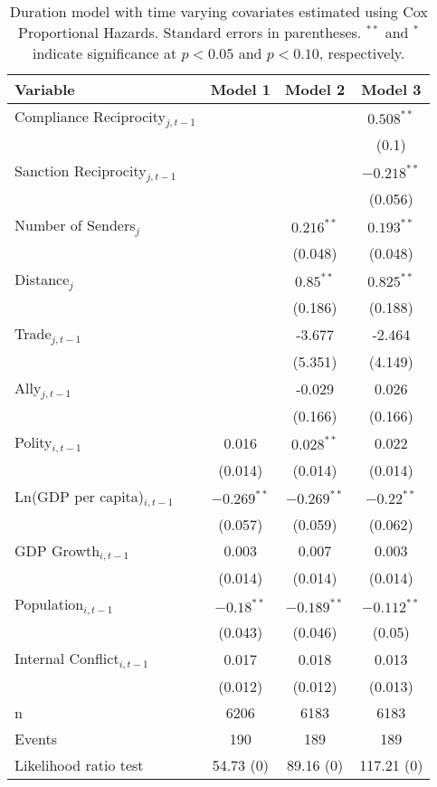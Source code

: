 \begin{table}[ht]
\centering
\begingroup\normalsize
\begin{tabular}{lccc}
 Variable & Model 1 & Model 2 & Model 3 \\ 
  \hline
\hline
Compliance Reciprocity$_{j,t-1}$ &  &  & $0.508^{\ast\ast}$ \\ 
   &  &  & (0.1) \\ 
  Sanction Reciprocity$_{j,t-1}$ &  &  & $-0.218^{\ast\ast}$ \\ 
   &  &  & (0.056) \\ 
   \hline
Number of Senders$_{j}$ &  & $0.216^{\ast\ast}$ & $0.193^{\ast\ast}$ \\ 
   &  & (0.048) & (0.048) \\ 
  Distance$_{j}$ &  & $0.85^{\ast\ast}$ & $0.825^{\ast\ast}$ \\ 
   &  & (0.186) & (0.188) \\ 
  Trade$_{j,t-1}$ &  & -3.677 & -2.464 \\ 
   &  & (5.351) & (4.149) \\ 
  Ally$_{j,t-1}$ &  & -0.029 & 0.026 \\ 
   &  & (0.166) & (0.166) \\ 
   \hline
Polity$_{i,t-1}$ & 0.016 & $0.028^{\ast\ast}$ & 0.022 \\ 
   & (0.014) & (0.014) & (0.014) \\ 
  Ln(GDP per capita)$_{i,t-1}$ & $-0.269^{\ast\ast}$ & $-0.269^{\ast\ast}$ & $-0.22^{\ast\ast}$ \\ 
   & (0.057) & (0.059) & (0.062) \\ 
  GDP Growth$_{i,t-1}$ & 0.003 & 0.007 & 0.003 \\ 
   & (0.014) & (0.014) & (0.014) \\ 
  Population$_{i,t-1}$ & $-0.18^{\ast\ast}$ & $-0.189^{\ast\ast}$ & $-0.112^{\ast\ast}$ \\ 
   & (0.043) & (0.046) & (0.05) \\ 
  Internal Conflict$_{i,t-1}$ & 0.017 & 0.018 & 0.013 \\ 
   & (0.012) & (0.012) & (0.013) \\ 
   \hline
n & 6206 & 6183 & 6183 \\ 
  Events & 190 & 189 & 189 \\ 
  Likelihood ratio test & 54.73 (0) & 89.16 (0) & 117.21 (0) \\ 
   \hline
\hline
\end{tabular}
\endgroup
\caption{Duration model with time varying covariates estimated using Cox Proportional Hazards. Standard errors in parentheses. $^{**}$ and $^{*}$ indicate significance at $p< 0.05 $ and $p< 0.10 $, respectively.} 
\label{tab:regResults}
\end{table}
